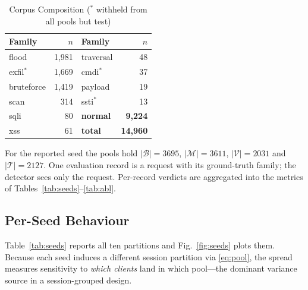 \documentclass[conference]{IEEEtran}
\begin{document}
\begin{table}[H]
\caption{Corpus Composition ($^{*}$ withheld from all pools but test)}
\label{tab:corpus}
\centering
\footnotesize
\begin{tabularx}{\columnwidth}{@{}LrLr@{}}
\toprule
\textbf{Family} & \textbf{$n$} & \textbf{Family} & \textbf{$n$} \\
\midrule
flood       & 1{,}981 & traversal & 48 \\
exfil$^{*}$ & 1{,}669 & cmdi$^{*}$ & 37 \\
bruteforce  & 1{,}419 & payload   & 19 \\
scan        & 314     & ssti$^{*}$ & 13 \\
sqli        & 80      & \textbf{normal} & \textbf{9{,}224} \\
xss         & 61      & \textbf{total}  & \textbf{14{,}960} \\
\bottomrule
\end{tabularx}
\end{table}

For the reported seed the pools hold $|\mathcal{B}|=3695$, $|\mathcal{M}|=3611$,
$|\mathcal{V}|=2031$ and $|\mathcal{T}|=2127$. One evaluation record is a request with its
ground-truth family; the detector sees only the request. Per-record verdicts are aggregated
into the metrics of Tables~\ref{tab:seeds}--\ref{tab:abl}.

\subsection{Per-Seed Behaviour}
\label{sec:seeds}
Table~\ref{tab:seeds} reports all ten partitions and Fig.~\ref{fig:seeds} plots them. Because
each seed induces a different session partition via \eqref{eq:pool}, the spread measures
sensitivity to \emph{which clients} land in which pool---the dominant variance source in a
session-grouped design.
\end{document}
